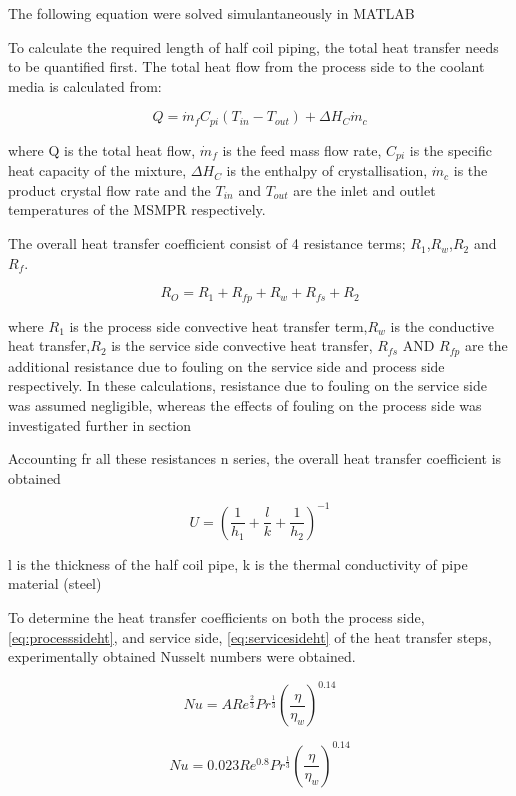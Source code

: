 The following equation were solved simulantaneously in MATLAB 


To calculate the required length of half coil piping, the total heat transfer needs to be quantified first. The total heat flow from the process side to the coolant media is calculated from:

\begin{equation} \label{eq:energy balance}
    Q =  \Dot{m}_{f}C_{pi}(T_{in}-T_{out})+ \Delta H_{C}\Dot{m}_{c}
\end{equation}

\noindent where Q is the total heat flow, $\Dot{m}_f$ is the feed mass flow rate, $C_{pi}$ is the specific heat capacity of the mixture, $\Delta H_{C}$ is the enthalpy of crystallisation, $\Dot{m}_{c}$ is the product crystal flow rate and the $T_{in}$ and $T_{out}$ are the inlet and outlet temperatures of the MSMPR respectively.


The overall heat transfer coefficient consist of 4 resistance terms; $R_1$,$R_w$,$R_2$ and $R_f$.

\begin{equation} \label{eq:resistht}
    R_O = R_1 + R_{fp} + R_w + R_{fs} + R_2
\end{equation}

where $R_1$ is the process side convective heat transfer term,$R_w$ is the conductive heat transfer,$R_2$ is the service side convective heat transfer, $R_{fs}$ AND $R_{fp}$ are the additional resistance due to fouling on the service side and process side respectively. In these calculations, resistance due to fouling on the service side was assumed negligible, whereas the effects of fouling on the process side was investigated further in section %

Accounting fr all these resistances n series, the overall heat transfer coefficient is obtained  

\begin{equation} \label{eq:energy balance}
    U = \left(\frac{1}{h_1} + \frac{l}{k}   + \frac{1}{h_2 } \right)^{-1}
\end{equation}

l is the thickness of the half coil pipe, k is the thermal conductivity of pipe material (steel)


To determine the heat transfer coefficients on both the process side,\ref{eq:processsideht},  and service side, \ref{eq:servicesideht} of the heat transfer steps, experimentally obtained Nusselt numbers were obtained. 



\begin{equation} \label{eq:processsideht}
    Nu = ARe^{\frac{2}{3}}Pr^{\frac{1}{3}}\left( \frac{\eta}{\eta_w} \right)^{0.14}
\end{equation}

\begin{equation} \label{eq:servicesideht}
    Nu = 0.023Re^{0.8}Pr^{\frac{1}{3}} \left( \frac{\eta}{\eta_w} \right)^{0.14}
\end{equation}



